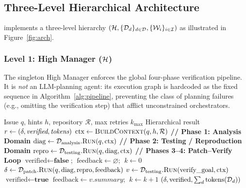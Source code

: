 \subsection{Three-Level Hierarchical Architecture}
\label{sec:arch:hierarchy}

\sysname implements a three-level hierarchy $(\mathcal{H}, \{\mathcal{D}_d\}_{d \in
\mathcal{D}}, \{\mathcal{W}_i\}_{i \in \mathcal{I}})$ as illustrated in
Figure~\ref{fig:arch}.

\subsubsection{Level 1: High Manager ($\mathcal{H}$)}

The singleton High Manager enforces the global four-phase verification
pipeline. It is \emph{not} an LLM-planning agent: its execution graph is
hardcoded as the fixed sequence in Algorithm~\ref{alg:pipeline}, preventing
the class of planning failures (e.g., omitting the verification step) that
afflict unconstrained orchestrators.

\begin{algorithm}[t]
\caption{Level 1 High Manager: Four-Phase Verification Pipeline}
\label{alg:pipeline}
\begin{algorithmic}[1]
\Require Issue $q$, hints $h$, repository $\mathcal{R}$, max retries $k_{\max}$
\Ensure Hierarchical result $r \gets ({\delta}, \textit{verified}, \textit{tokens})$
\State $\text{ctx} \gets \textsc{BuildContext}(q, h, \mathcal{R})$
\State \textbf{// Phase 1: Analysis Domain}
\State $\text{diag} \gets \mathcal{D}_{\text{analysis}}.\textsc{Run}(q, \text{ctx})$
\State \textbf{// Phase 2: Testing / Reproduction Domain}
\State $\text{repro} \gets \mathcal{D}_{\text{testing}}.\textsc{Run}(q, \text{diag}, \text{ctx})$
\State \textbf{// Phases 3--4: Patch--Verify Loop}
\State $\text{verified} \gets \textbf{false}$; $\;\text{feedback} \gets \varnothing$; $\;k \gets 0$
  \State $\delta \gets \mathcal{D}_{\text{patch}}.\textsc{Run}(q, \text{diag}, \text{repro}, \text{feedback})$
  \State $v \gets \mathcal{D}_{\text{testing}}.\textsc{Run}(\text{verify\_goal}, \text{ctx})$
    \State $\text{verified} \gets \textbf{true}$
  \Else
    \State $\text{feedback} \gets v.\textit{summary}$; $\;k \gets k + 1$
  \EndIf
\EndWhile
\State \Return $(\delta, \text{verified}, \sum_d \text{tokens}(\mathcal{D}_d))$
\end{algorithmic}
\end{algorithm}

